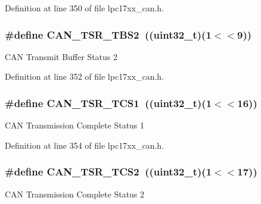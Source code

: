 \-Definition at line 350 of file lpc17xx\-\_\-can.\-h.

\hypertarget{group___c_a_n___private___macros_ga09cb2c2b5fde554c7b667ab22a77d94f}{
\subsubsection[{\-C\-A\-N\-\_\-\-T\-S\-R\-\_\-\-T\-B\-S2}]{\setlength{\rightskip}{0pt plus 5cm}\#define {\bf \-C\-A\-N\-\_\-\-T\-S\-R\-\_\-\-T\-B\-S2}~((uint32\-\_\-t)(1$<$$<$9))}}\label{group___c_a_n___private___macros_ga09cb2c2b5fde554c7b667ab22a77d94f}
\-C\-A\-N \-Transmit \-Buffer \-Status 2 

\-Definition at line 352 of file lpc17xx\-\_\-can.\-h.

\hypertarget{group___c_a_n___private___macros_ga931870ccc1084b1b5849523da915d0f5}{
\subsubsection[{\-C\-A\-N\-\_\-\-T\-S\-R\-\_\-\-T\-C\-S1}]{\setlength{\rightskip}{0pt plus 5cm}\#define {\bf \-C\-A\-N\-\_\-\-T\-S\-R\-\_\-\-T\-C\-S1}~((uint32\-\_\-t)(1$<$$<$16))}}\label{group___c_a_n___private___macros_ga931870ccc1084b1b5849523da915d0f5}
\-C\-A\-N \-Transmission \-Complete \-Status 1 

\-Definition at line 354 of file lpc17xx\-\_\-can.\-h.

\hypertarget{group___c_a_n___private___macros_gaa729cda3978cc925c3045d360851ab62}{
\subsubsection[{\-C\-A\-N\-\_\-\-T\-S\-R\-\_\-\-T\-C\-S2}]{\setlength{\rightskip}{0pt plus 5cm}\#define {\bf \-C\-A\-N\-\_\-\-T\-S\-R\-\_\-\-T\-C\-S2}~((uint32\-\_\-t)(1$<$$<$17))}}\label{group___c_a_n___private___macros_gaa729cda3978cc925c3045d360851ab62}
\-C\-A\-N \-Transmission \-Complete \-Status 2 

